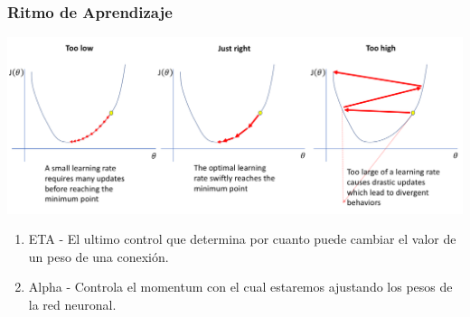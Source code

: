 \begin{frame}
	\frametitle{Ritmo de Aprendizaje}
	\includegraphics[scale=0.3]{learningrate}
	\begin{enumerate}
		\item ETA - El ultimo control que determina por cuanto puede cambiar el valor de un peso de una conexi\'on.
		\item Alpha - Controla el momentum con el cual estaremos ajustando los pesos de la red neuronal. 
	\end{enumerate}
\end{frame}
